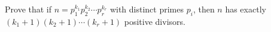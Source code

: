 Prove that if $n=p_1^{k_1}p_2^{k_2}\cdots p_r^{k_r}$ with distinct primes $p_i$, then $n$ has exactly $(k_1+1)(k_2+1)\cdots(k_r+1)$ positive divisors.
